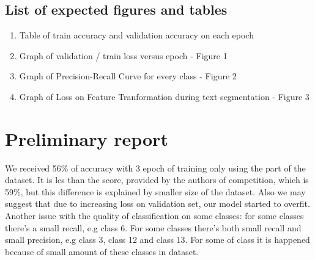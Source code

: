 \documentclass{article}
\begin{document}
\subsection{List of expected figures and tables}
\begin{enumerate}
    \item Table of train accuracy and validation accuracy on each epoch
    \item Graph of validation / train loss versus epoch - Figure 1
    \item Graph of Precision-Recall Curve for every class - Figure 2
    \item Graph of Loss on Feature Tranformation during text segmentation - Figure 3 
\end{enumerate}





  
\section{Preliminary report}

We received 56$\%$ of accuracy with 3 epoch of training only using the part of the dataset. It is les than the score, provided by the authors of competition, which is 59$\%$, but this difference is explained by smaller size of the dataset. Also we may suggest that due to increasing loss on validation set, our model started to overfit. Another issue with the quality of classification on some classes: for some classes there's a small recall, e.g class 6. For some classes there's both small recall and small precision, e.g class 3, class 12 and class 13. For some of class it is happened because of small amount of these classes in dataset. 
\end{document}
